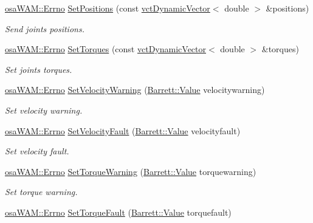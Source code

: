 \begin{DoxyCompactItemize}
\hyperlink{classosa_w_a_m_aff15893cc52d67e46cb66de794109f9e}{osa\+W\+A\+M\+::\+Errno} \hyperlink{classosa_w_a_m_a1bd84ef3de2b32939d9120ed27470b5c}{Set\+Positions} (const \hyperlink{classvct_dynamic_vector}{vct\+Dynamic\+Vector}$<$ double $>$ \&positions)
\begin{DoxyCompactList}\small\item\em Send joints positions. \end{DoxyCompactList}\item 
\hyperlink{classosa_w_a_m_aff15893cc52d67e46cb66de794109f9e}{osa\+W\+A\+M\+::\+Errno} \hyperlink{classosa_w_a_m_a28246d128d27d1c56ddbea80395e872a}{Set\+Torques} (const \hyperlink{classvct_dynamic_vector}{vct\+Dynamic\+Vector}$<$ double $>$ \&torques)
\begin{DoxyCompactList}\small\item\em Set joints torques. \end{DoxyCompactList}\item 
\hyperlink{classosa_w_a_m_aff15893cc52d67e46cb66de794109f9e}{osa\+W\+A\+M\+::\+Errno} \hyperlink{classosa_w_a_m_a465f0046f44ba8e7d56bd8817318a9a9}{Set\+Velocity\+Warning} (\hyperlink{struct_barrett_a57ff132885344ca62e4b4b691885685b}{Barrett\+::\+Value} velocitywarning)
\begin{DoxyCompactList}\small\item\em Set velocity warning. \end{DoxyCompactList}\item 
\hyperlink{classosa_w_a_m_aff15893cc52d67e46cb66de794109f9e}{osa\+W\+A\+M\+::\+Errno} \hyperlink{classosa_w_a_m_a069bfa259430cb2d01b71f63a89f353b}{Set\+Velocity\+Fault} (\hyperlink{struct_barrett_a57ff132885344ca62e4b4b691885685b}{Barrett\+::\+Value} velocityfault)
\begin{DoxyCompactList}\small\item\em Set velocity fault. \end{DoxyCompactList}\item 
\hyperlink{classosa_w_a_m_aff15893cc52d67e46cb66de794109f9e}{osa\+W\+A\+M\+::\+Errno} \hyperlink{classosa_w_a_m_a3242d281674710f9a0a277f833660b2d}{Set\+Torque\+Warning} (\hyperlink{struct_barrett_a57ff132885344ca62e4b4b691885685b}{Barrett\+::\+Value} torquewarning)
\begin{DoxyCompactList}\small\item\em Set torque warning. \end{DoxyCompactList}\item 
\hyperlink{classosa_w_a_m_aff15893cc52d67e46cb66de794109f9e}{osa\+W\+A\+M\+::\+Errno} \hyperlink{classosa_w_a_m_a0dd7b8486a6b041d794876c3faa062a2}{Set\+Torque\+Fault} (\hyperlink{struct_barrett_a57ff132885344ca62e4b4b691885685b}{Barrett\+::\+Value} torquefault)

\end{DoxyCompactItemize}
